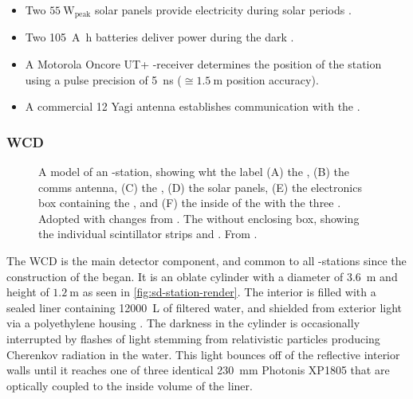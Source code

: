 \begin{itemize}
	\item Two $\SI{55}{\watt}_\mathrm{peak}$ solar panels provide 
	electricity during solar periods 
	\cite{collaborationPierreAugerObservatory2016}.
	\item Two \SI{105}{\ampere\hour} batteries deliver power during	the 
	dark \cite{collaborationPierreAugerObservatory2016}.
	\item A Motorola Oncore UT+ \GPS-receiver determines the position of the
	station using a pulse precision of \SI{5}{\nano\second} 
	\cite{networktimefoundationMotorolaOncoreGPS, 
	collaborationPierreAugerObservatory2016} ($\cong\SI{1.5}{\meter}$
	position accuracy).
	\item A commercial \SI{12}{\dBi} Yagi antenna \cite{rfwel12DBiYagi} 
	establishes communication with the \CDAS.
\end{itemize}

\subsubsection{\acf{WCD}}

\begin{figure}[t]
  \centering
  \hspace{0.2cm}
  \caption[]{ A model of an \SD-station, showing
  wht the label (A) the \RD, (B) the comms antenna, (C) the \SSD, (D) the solar
  panels, (E) the electronics box containing the \UUB, and (F) the inside of the
  \WCD with the three \LPMTs. Adopted with changes from 
  \cite{filipPotentialNeuralNetwork2023}.  The 
  \SSD without enclosing box, showing the individual scintillator strips and 
  \WLSs. From \cite{schmidtUHECR2024ProceedingEdits25}.}
  \label{fig:sd-station-components}
\end{figure}

The \acf{WCD} is the main detector component, and common to all \SD-stations 
since the construction of the \PAO began. It is an oblate cylinder with a 
diameter of \SI{3.6}{\meter} and height of $\SI{1.2}{\meter}$ as seen in 
\cref{fig:sd-station-render}. The interior is filled with a sealed liner 
containing \SI{12000}{\liter} of filtered water, and shielded from exterior 
light via a polyethylene housing \cite{allekotteSurfaceDetectorSystem2008}. The 
darkness in the cylinder is occasionally interrupted by flashes of light 
stemming from relativistic particles producing Cherenkov radiation in the water.
This light bounces off of the reflective interior walls until it reaches one of 
three identical \SI{230}{\milli\meter} Photonis XP1805 \LPMTs 
\cite{tripathiSystematicStudyLarge2003} that are optically coupled to the inside
volume of the liner.

